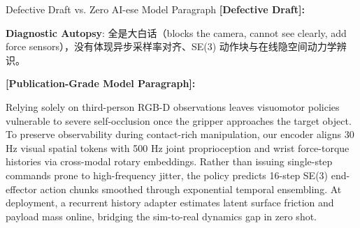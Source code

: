 \begin{ExampleBox}{Defective Draft vs. Zero AI-ese Model Paragraph}
\textbf{\color{TargetHighlight}[Defective Draft]:}\par
{}\par\vspace{4pt}
\textbf{Diagnostic Autopsy}: 全是大白话（blocks the camera, cannot see clearly, add force sensors），没有体现异步采样率对齐、SE(3) 动作块与在线隐空间动力学辨识。\par\vspace{6pt}
\textbf{\color{AcadNavy}[Publication-Grade Model Paragraph]:}\par
Relying solely on third-person RGB-D observations leaves visuomotor policies vulnerable to severe self-occlusion once the gripper approaches the target object. To preserve observability during contact-rich manipulation, our encoder aligns 30 Hz visual spatial tokens with 500 Hz joint proprioception and wrist force-torque histories via cross-modal rotary embeddings. Rather than issuing single-step commands prone to high-frequency jitter, the policy predicts 16-step SE(3) end-effector action chunks smoothed through exponential temporal ensembling. At deployment, a recurrent history adapter estimates latent surface friction and payload mass online, bridging the sim-to-real dynamics gap in zero shot.
\end{ExampleBox}
